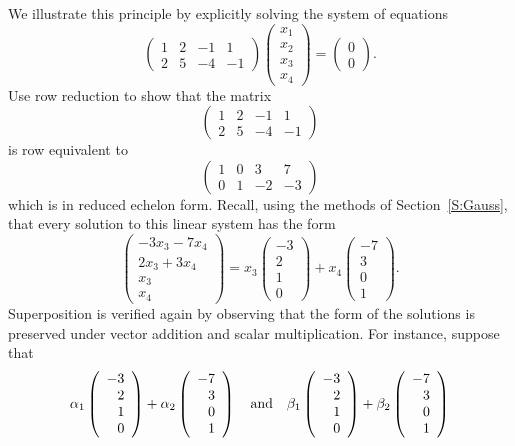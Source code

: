 We illustrate this principle by explicitly solving the system of
equations
\[
\left(\begin{array}{rrrr} 1 & 2 & -1 & 1\\ 2 & 5 & -4 & -1
\end{array}\right)\left(\begin{array}{c} x_1\\x_2\\x_3\\x_4
\end{array}\right) = \left(\begin{array}{c} 0\\0
\end{array}\right).
\]
Use row reduction to show that the matrix
\[
\left(\begin{array}{rrrr} 1 & 2 & -1 & 1\\ 2 & 5 & -4 & -1
\end{array}\right)
\]
is row equivalent to
\[
\left(\begin{array}{rrrr} 1 & 0 & 3 & 7\\ 0 & 1 & -2 & -3
\end{array}\right)
\]
which is in reduced echelon form.  Recall, using the methods of
Section~\ref{S:Gauss}, that every
solution to this linear system has the form
\[
\left(\begin{array}{c} -3x_3-7x_4\\ 2x_3+3x_4\\ x_3\\
x_4\end{array}\right) =
x_3\left(\begin{array}{r}-3\\2\\1\\0\end{array}\right) +
x_4\left(\begin{array}{r}-7\\3\\0\\1\end{array}\right).
\]
Superposition is verified again by observing that the form of 
the solutions is preserved under vector addition and scalar
multiplication.  For instance, suppose that
\[
\alpha_1 \left(\begin{array}{r}-3\\2\\1\\0\end{array}\right) +
\alpha_2 \left(\begin{array}{r}-7\\3\\0\\1\end{array}\right)
\quad\mbox{and}\quad
\beta_1 \left(\begin{array}{r}-3\\2\\1\\0\end{array}\right) +
\beta_2 \left(\begin{array}{r}-7\\3\\0\\1\end{array}\right)
\]
